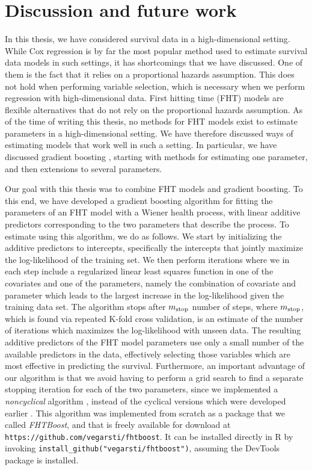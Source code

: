 \chapter{Discussion and future work}
\label{sec:discussion}
In this thesis, we have considered survival data in a high-dimensional setting.
While Cox regression is by far the most popular method used to estimate survival data models in such settings, it has shortcomings that we have discussed.
One of them is the fact that it relies on a proportional hazards assumption.
This does not hold when performing variable selection, which is necessary when we perform regression with high-dimensional data.
First hitting time (FHT) models are flexible alternatives that do not rely on the proportional hazards assumption.
As of the time of writing this thesis, no methods for FHT models exist to estimate parameters in a high-dimensional setting.
We have therefore discussed ways of estimating models that work well in such a setting.
In particular, we have discussed gradient boosting \citep{friedman2001}, starting with methods for estimating one parameter, and then extensions to several parameters.

Our goal with this thesis was to combine FHT models and gradient boosting.
To this end, we have developed a gradient boosting algorithm for fitting the parameters of an FHT model with a Wiener health process, with linear additive predictors corresponding to the two parameters that describe the process.
To estimate using this algorithm, we do as follows.
We start by initializing the additive predictors to intercepts, specifically the intercepts that jointly maximize the log-likelihood of the training set.
We then perform iterations where we in each step include a regularized linear least squares function in one of the covariates and one of the parameters, namely the combination of covariate and parameter which leads to the largest increase in the log-likelihood given the training data set.
The algorithm stops after $m_{\text{stop}}$ number of steps, where $m_{\text{stop}}$, which is found via repeated K-fold cross validation, is an estimate of the number of iterations which maximizes the log-likelihood with unseen data.
The resulting additive predictors of the FHT model parameters use only a small number of the available predictors in the data, effectively selecting those variables which are most effective in predicting the survival.
Furthermore, an important advantage of our algorithm is that we avoid having to perform a grid search to find a separate stopping iteration for each of the two parameters, since we implemented a \textit{noncyclical} algorithm \citep{thomas2018}, instead of the cyclical versions which were developed earlier \citep{schmid}.
This algorithm was implemented from scratch as a package that we called \textit{FHTBoost}, and that is freely available for download at \verb|https://github.com/vegarsti/fhtboost|.
It can be installed directly in R by invoking \verb|install_github("vegarsti/fhtboost")|, assuming the DevTools package \citep{devtools} is installed.

